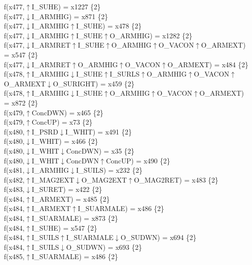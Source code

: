 f(x477,$\uparrow$I\_SUHE) = x1227 \{2\} \\  
f(x477,$\downarrow$I\_ARMHIG) = x871 \{2\} \\  
f(x477,$\downarrow$I\_ARMHIG$\uparrow$I\_SUHE) = x478 \{2\} \\  
f(x477,$\downarrow$I\_ARMHIG$\uparrow$I\_SUHE$\uparrow$O\_ARMHIG) = x1282 \{2\} \\  
f(x477,$\downarrow$I\_ARMRET$\uparrow$I\_SUHE$\uparrow$O\_ARMHIG$\uparrow$O\_VACON$\uparrow$O\_ARMEXT) = x547 \{2\} \\  
f(x477,$\downarrow$I\_ARMRET$\uparrow$O\_ARMHIG$\uparrow$O\_VACON$\uparrow$O\_ARMEXT) = x484 \{2\} \\  
f(x478,$\uparrow$I\_ARMHIG$\downarrow$I\_SUHE$\uparrow$I\_SURLS$\uparrow$O\_ARMHIG$\uparrow$O\_VACON$\uparrow$O\_ARMEXT$\downarrow$O\_SURIGHT) = x459 \{2\} \\  
f(x478,$\uparrow$I\_ARMHIG$\downarrow$I\_SUHE$\uparrow$O\_ARMHIG$\uparrow$O\_VACON$\uparrow$O\_ARMEXT) = x872 \{2\} \\  
f(x479,$\uparrow$ConcDWN) = x465 \{2\} \\  
f(x479,$\uparrow$ConcUP) = x73 \{2\} \\  
f(x480,$\uparrow$I\_PSRD$\downarrow$I\_WHIT) = x491 \{2\} \\  
f(x480,$\downarrow$I\_WHIT) = x466 \{2\} \\  
f(x480,$\downarrow$I\_WHIT$\downarrow$ConcDWN) = x35 \{2\} \\  
f(x480,$\downarrow$I\_WHIT$\downarrow$ConcDWN$\uparrow$ConcUP) = x490 \{2\} \\  
f(x481,$\downarrow$I\_ARMHIG$\downarrow$I\_SUILS) = x232 \{2\} \\  
f(x482,$\uparrow$I\_MAG2EXT$\downarrow$O\_MAG2EXT$\uparrow$O\_MAG2RET) = x483 \{2\} \\  
f(x483,$\downarrow$I\_SURET) = x422 \{2\} \\  
f(x484,$\uparrow$I\_ARMEXT) = x485 \{2\} \\  
f(x484,$\uparrow$I\_ARMEXT$\uparrow$I\_SUARMALE) = x486 \{2\} \\  
f(x484,$\uparrow$I\_SUARMALE) = x873 \{2\} \\  
f(x484,$\uparrow$I\_SUHE) = x547 \{2\} \\  
f(x484,$\uparrow$I\_SUILS$\uparrow$I\_SUARMALE$\downarrow$O\_SUDWN) = x694 \{2\} \\  
f(x484,$\uparrow$I\_SUILS$\downarrow$O\_SUDWN) = x693 \{2\} \\  
f(x485,$\uparrow$I\_SUARMALE) = x486 \{2\} \\  

